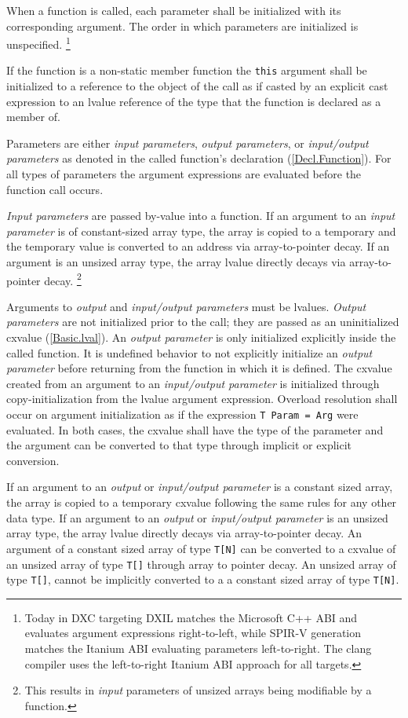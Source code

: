 \p When a function is called, each parameter shall be initialized with its
corresponding argument. The order in which parameters are initialized is
unspecified. \footnote{Today in DXC targeting DXIL matches the Microsoft C++ ABI
and evaluates argument expressions right-to-left, while SPIR-V generation
matches the Itanium ABI evaluating parameters left-to-right. The clang compiler
uses the left-to-right Itanium ABI approach for all targets.}

\p If the function is a non-static member function the \texttt{this} argument
shall be initialized to a reference to the object of the call as if casted by an
explicit cast expression to an lvalue reference of the type that the function is
declared as a member of.

\p Parameters are either \textit{input parameters}, \textit{output parameters},
or \textit{input/output parameters} as denoted in the called function's
declaration (\ref{Decl.Function}). For all types of parameters the argument
expressions are evaluated before the function call occurs.

\p \textit{Input parameters} are passed by-value into a function. If an argument
to an \textit{input parameter} is of constant-sized array type, the array is
copied to a temporary and the temporary value is converted to an address via
array-to-pointer decay. If an argument is an unsized array type, the array
lvalue directly decays via array-to-pointer decay. \footnote{This results in
\textit{input} parameters of unsized arrays being modifiable by a function.}

\p Arguments to \textit{output} and \textit{input/output parameters} must be
lvalues. \textit{Output parameters} are not initialized prior to the call; they
are passed as an uninitialized cxvalue (\ref{Basic.lval}). An \textit{output
parameter} is only initialized explicitly inside the called function. It is
undefined behavior to not explicitly initialize an \textit{output parameter}
before returning from the function in which it is defined. The cxvalue created
from an argument to an \textit{input/output parameter} is initialized through
copy-initialization from the lvalue argument expression. Overload resolution
shall occur on argument initialization as if the expression \texttt{T Param =
Arg} were evaluated. In both cases, the cxvalue shall have the type of the
parameter and the argument can be converted to that type through implicit or
explicit conversion.

\p If an argument to an \textit{output} or \textit{input/output parameter} is a
constant sized array, the array is copied to a temporary cxvalue following the
same rules for any other data type. If an argument to an \textit{output} or
\textit{input/output parameter} is an unsized array type, the array lvalue
directly decays via array-to-pointer decay. An argument of a constant sized
array of type \texttt{T[N]} can be converted to a cxvalue of an unsized array
of type \texttt{T[]} through array to pointer decay. An unsized array of type
\texttt{T[]}, cannot be implicitly converted to a a constant sized array of type
\texttt{T[N]}.

